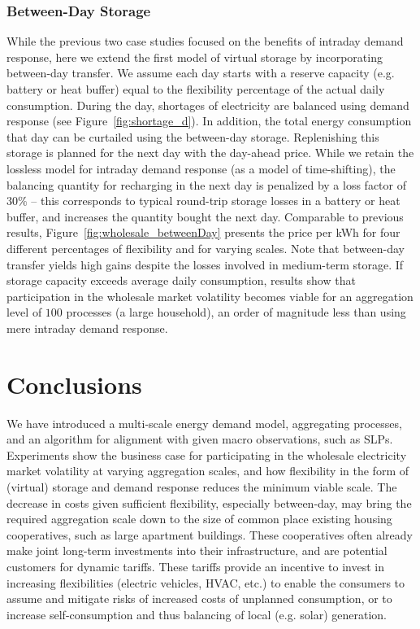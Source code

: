 \documentclass[conference]{IEEEtran}
\begin{document}
\subsubsection{Between-Day Storage}
While the previous two case studies focused on the benefits of intraday demand response, here we extend the first model of virtual storage by incorporating between-day transfer. We assume each day starts with a reserve capacity (e.g. battery or heat buffer) equal to the flexibility percentage of the actual daily consumption. During the day, shortages of electricity are balanced using demand response (see Figure~\ref{fig:shortage_d}). In addition, the total energy consumption that day can be curtailed using the between-day storage. Replenishing this storage is planned for the next day with the day-ahead price. While we retain the lossless model for intraday demand response (as a model of time-shifting), the balancing quantity for recharging in the next day is penalized by a loss factor of $30\%$ -- this corresponds to typical round-trip storage losses in a battery or heat buffer, and increases the quantity bought the next day. Comparable to previous results, Figure~\ref{fig:wholesale_betweenDay} presents the price per kWh for four different percentages of flexibility and for varying scales. Note that between-day transfer yields high gains despite the losses involved in medium-term storage. If storage capacity exceeds average daily consumption, results show that participation in the wholesale market volatility becomes viable for an aggregation level of $100$ processes (a large household), an order of magnitude less than using mere intraday demand response.


\section{Conclusions}
\label{sec:Conclusion}

We have introduced a multi-scale energy demand model, aggregating processes, and an algorithm for alignment with given macro observations, such as SLPs. Experiments show the business case for participating in the wholesale electricity market volatility at varying aggregation scales, and how flexibility in the form of (virtual) storage and demand response reduces the minimum viable scale. The decrease in costs given sufficient flexibility, especially between-day, may bring the required aggregation scale down to the size of common place existing housing cooperatives, such as large apartment buildings. These cooperatives often already make joint long-term investments into their infrastructure, and are potential customers for dynamic tariffs. These tariffs provide an incentive to invest in increasing flexibilities (electric vehicles, HVAC, etc.) to enable the consumers to assume and mitigate risks of increased costs of unplanned consumption, or to increase self-consumption and thus balancing of local (e.g. solar) generation.
\end{document}
